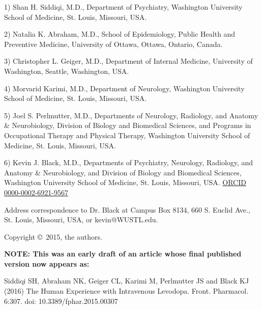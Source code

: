 1) Shan H. Siddiqi, M.D., Department of Psychiatry, Washington University School of Medicine, St. Louis, Missouri, USA.

2) Natalia K. Abraham, M.D., School of Epidemiology, Public Health and Preventive Medicine, University of Ottawa, Ottawa, Ontario, Canada.

3) Christopher L. Geiger, M.D., Department of Internal Medicine, University of Washington, Seattle, Washington, USA.

4) Morvarid Karimi, M.D., Department of Neurology, Washington University School of Medicine, St. Louis, Missouri, USA.

5) Joel S. Perlmutter, M.D., Departments of Neurology, Radiology, and Anatomy & Neurobiology, Division of Biology and Biomedical Sciences, and Programs in Occupational Therapy and Physical Therapy, Washington University School of Medicine, St. Louis, Missouri, USA.

6) Kevin J. Black, M.D., Departments of Psychiatry, Neurology, Radiology, and Anatomy \& Neurobiology, and Division of Biology and Biomedical Sciences, Washington University School of Medicine, St. Louis, Missouri, USA.  \href{http://orcid.org/0000-0002-6921-9567}{ORCID 0000-0002-6921-9567}

Address correspondence to Dr. Black at Campus Box 8134, 660 S. Euclid Ave., St. Louis, Missouri, USA, or kevin@WUSTL.edu.

Copyright \copyright\, 2015, the authors.

\textbf{NOTE: This was an early draft of an article whose final published version now appears as:}

Siddiqi SH, Abraham NK, Geiger CL, Karimi M, Perlmutter JS and Black KJ (2016) The Human Experience with Intravenous Levodopa. Front. Pharmacol. 6:307. doi: 10.3389/fphar.2015.00307
